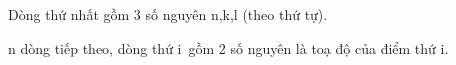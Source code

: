 Dòng thứ nhất gồm 3 số nguyên n,k,l (theo thứ tự).

n dòng tiếp theo, dòng thứ i gồm 2 số nguyên là toạ độ của điểm thứ i.